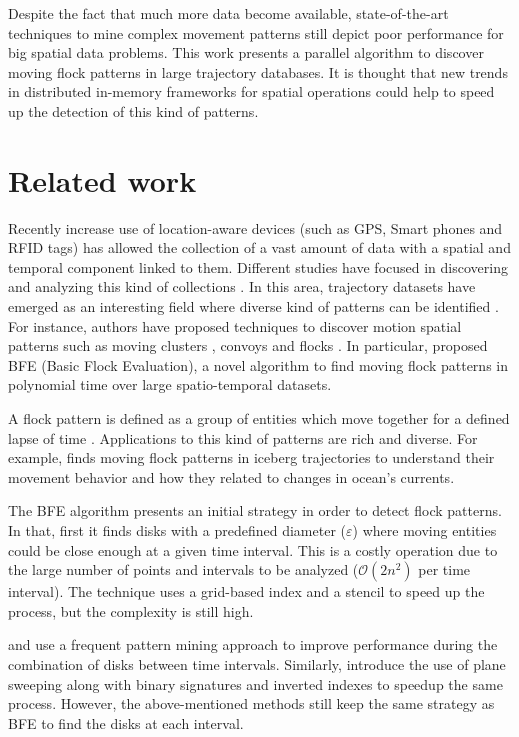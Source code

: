Despite the fact that much more data become available, state-of-the-art techniques to mine complex movement patterns still depict poor performance for big spatial data problems.  This work presents a parallel algorithm to discover moving flock patterns in large trajectory databases.  It is thought that new trends in distributed in-memory frameworks for spatial operations could help to speed up the detection of this kind of patterns.

\section{Related work}
Recently increase use of location-aware devices (such as GPS, Smart phones and RFID tags) has allowed the collection of a vast amount of data with a spatial and 
temporal component linked to them.  Different studies have focused in discovering and analyzing this kind of collections \cite{leung_knowledge_2010, 
miller_geographic_2001}.  In this area, trajectory datasets have emerged as an interesting field where diverse kind of patterns can be identified 
\cite{zheng_computing_2011, vieira_spatio-temporal_2013}.  For instance, authors have proposed techniques to discover motion spatial patterns such as moving 
clusters \cite{kalnis_discovering_2005}, convoys \cite{jeung_discovery_2008} and flocks \cite{benkert_reporting_2008, gudmundsson_computing_2006}.  In 
particular, \cite{vieira_-line_2009} proposed BFE (Basic Flock Evaluation), a novel algorithm to find moving flock patterns in polynomial time over large 
spatio-temporal datasets. 

A flock pattern is defined as a group of entities which move together for a defined lapse of time \cite{benkert_reporting_2008}.  Applications to this kind of 
patterns are rich and diverse.  For example, \cite{calderon_mining_2011} finds moving flock patterns in iceberg trajectories to understand their movement 
behavior and how they related to changes in ocean's currents. 

The BFE algorithm presents an initial strategy in order to detect flock patterns.  In that, first it finds disks with a predefined diameter ($\varepsilon$) where moving entities could be close enough at a given time interval.  This is a costly operation due to the large number of points and intervals to be analyzed ($\mathcal{O}(2n^2)$ per time interval).  The technique uses a grid-based index and a stencil to speed up the process, but the complexity is still high.

\cite{calderon_mining_2011} and \cite{turdukulov_visual_2014} use a frequent pattern mining approach to improve performance during the combination of disks 
between time intervals.  Similarly, \cite{tanaka_improved_2016} introduce the use of plane sweeping along with binary signatures and inverted indexes to speedup 
the same process.  However, the above-mentioned methods still keep the same strategy as BFE to find the disks at each interval.  

